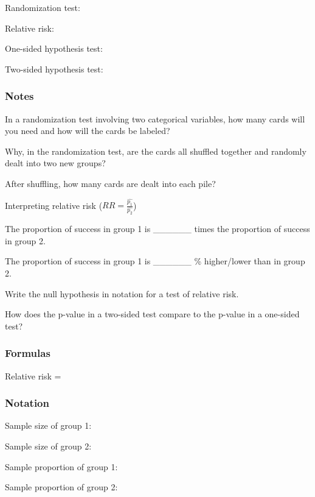\documentclass[
]{report}
\newcommand{\rgs}{\vspace{12pt}} %
\newcommand{\rgi}{\hspace{24pt}}  %
\begin{document}
Randomization test:
\rgs

Relative risk:
\rgs

One-sided hypothesis test:
\rgs

Two-sided hypothesis test:
\rgs

\hypertarget{notes-19}{%
\subsubsection*{Notes}\label{notes-19}}

In a randomization test involving two categorical variables, how many cards will you need and how will the cards be labeled?
\rgs

Why, in the randomization test, are the cards all shuffled together and randomly dealt into two new groups?
\rgs

After shuffling, how many cards are dealt into each pile?
\rgs

Interpreting relative risk (\(RR = \frac{\hat{p_1}}{\hat{p_2}}\))

\rgi The proportion of success in group 1 is \_\_\_\_\_\_ times the proportion of success in group 2.

\rgi The proportion of success in group 1 is \_\_\_\_\_\_ \% higher/lower than in group 2.

Write the null hypothesis in notation for a test of relative risk.
\rgs

How does the p-value in a two-sided test compare to the p-value in a one-sided test?
\rgs

\hypertarget{formulas-5}{%
\subsubsection*{Formulas}\label{formulas-5}}

Relative risk =
\rgs

\hypertarget{notation}{%
\subsubsection*{Notation}\label{notation}}

Sample size of group 1:
\rgs

Sample size of group 2:
\rgs

Sample proportion of group 1:
\rgs

Sample proportion of group 2:
\rgs
\end{document}
